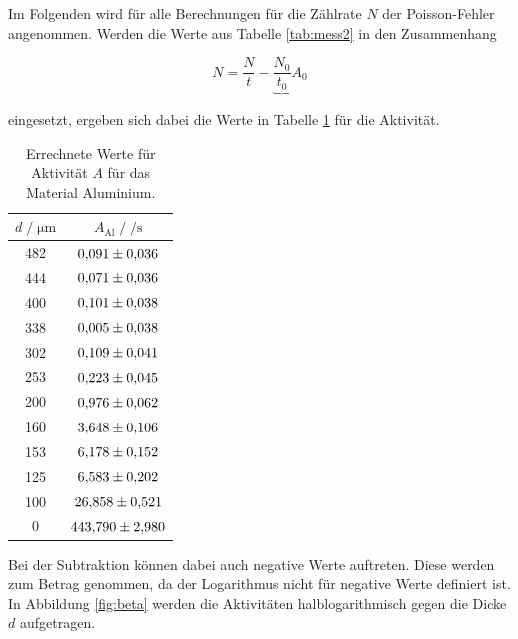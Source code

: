 Im Folgenden wird für alle Berechnungen für die Zählrate $N$ der Poisson-Fehler angenommen.  
Werden die Werte aus Tabelle \ref{tab:mess2} in den Zusammenhang

\begin{equation*}
N = \frac{N}{t}-\underbrace{\frac{N_0}{t_0}}{A_0}
\end{equation*}

eingesetzt, ergeben sich dabei die 
Werte in Tabelle \ref{tab:akti} für die Aktivität. 

\begin{table}
    \centering
    \caption{Errechnete Werte für Aktivität $A$ für das Material Aluminium.}
    \label{tab:akti}
    \begin{tabular}{c c}
    \toprule
    $ d \;/\; \si{\micro\meter} $ & $A_\text{Al} \;/\; \si{\per\second}$\\
    \midrule 
        482 & $\num{0.091+-0.036}$\\
        444 & $\num{0.071+-0.036}$\\
        400 & $\num{0.101+-0.038}$\\
        338 & $\num{0.005+-0.038}$\\
        302 & $\num{0.109+-0.041}$\\
        253 & $\num{0.223+-0.045}$\\
        200 & $\num{0.976+-0.062}$\\
        160 & $\num{3.648+-0.106}$\\
        153 & $\num{6.178+-0.152}$\\
        125 & $\num{6.583+-0.202}$\\  
        100 & $\num{26.858+-0.521}$\\ 
          0 & $\num{443.79+-2.980}$\\       
    \bottomrule
    \end{tabular}
\end{table}


Bei der Subtraktion können dabei auch negative Werte auftreten. Diese werden zum Betrag genommen, 
da der Logarithmus nicht für negative Werte definiert ist. 
In Abbildung \ref{fig:beta} werden die Aktivitäten halblogarithmisch gegen die Dicke $d$ aufgetragen. 

